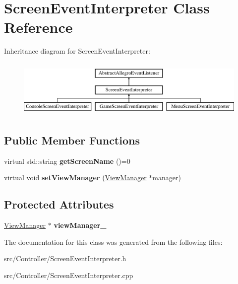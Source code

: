 \hypertarget{classScreenEventInterpreter}{}\section{Screen\+Event\+Interpreter Class Reference}
\label{classScreenEventInterpreter}
Inheritance diagram for Screen\+Event\+Interpreter\+:\begin{figure}[H]
\begin{center}
\leavevmode
\includegraphics[height=2.828283cm]{classScreenEventInterpreter}
\end{center}
\end{figure}
\subsection*{Public Member Functions}
\begin{DoxyCompactItemize}
\item 
virtual std\+::string {\bfseries get\+Screen\+Name} ()=0\hypertarget{classScreenEventInterpreter_a87536cf1705107e6c9cf00267e8c4e23}{}\label{classScreenEventInterpreter_a87536cf1705107e6c9cf00267e8c4e23}

\item 
virtual void {\bfseries set\+View\+Manager} (\hyperlink{classViewManager}{View\+Manager} $\ast$manager)\hypertarget{classScreenEventInterpreter_abba7b12ea942d3f0d67e79f68049e1de}{}\label{classScreenEventInterpreter_abba7b12ea942d3f0d67e79f68049e1de}

\end{DoxyCompactItemize}
\subsection*{Protected Attributes}
\begin{DoxyCompactItemize}
\item 
\hyperlink{classViewManager}{View\+Manager} $\ast$ {\bfseries view\+Manager\+\_\+}\hypertarget{classScreenEventInterpreter_ab50802769eed2eaa2dd4cc7eabcebb21}{}\label{classScreenEventInterpreter_ab50802769eed2eaa2dd4cc7eabcebb21}

\end{DoxyCompactItemize}


The documentation for this class was generated from the following files\+:\begin{DoxyCompactItemize}
\item 
src/\+Controller/Screen\+Event\+Interpreter.\+h\item 
src/\+Controller/Screen\+Event\+Interpreter.\+cpp\end{DoxyCompactItemize}
